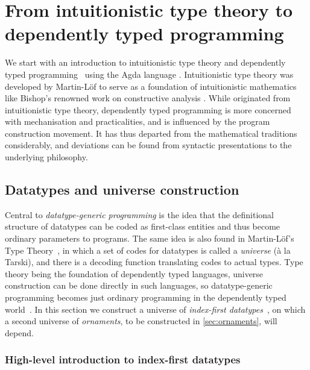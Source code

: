 \chapter{From intuitionistic type theory to dependently typed programming}
\label{chap:background}

We start with an introduction to intuitionistic type theory \citep{ML-ITT} and dependently typed programming~\citep{Altenkirch-why-dependent-types-matter, McBride-Epigram} using the Agda language \citep{Norell-thesis, Norell-Agda, Bove-dependent-types-at-work}.
Intuitionistic type theory was developed by Martin-Löf to serve as a foundation of intuitionistic mathematics like Bishop's renowned work on constructive analysis \citep{Bishop-analysis}.
While originated from intuitionistic type theory, dependently typed programming is more concerned with mechanisation and practicalities, and is influenced by the program construction movement.
It has thus departed from the mathematical traditions considerably, and deviations can be found from syntactic presentations to the underlying philosophy.

\section{Datatypes and universe construction}

Central to \emph{datatype-generic programming} is the idea that the definitional structure of datatypes can be coded as first-class entities and thus become ordinary parameters to programs.
The same idea is also found in Martin-Löf's Type Theory~\citep{ML-ITT}, in which a set of codes for datatypes is called a \emph{universe} (à la Tarski), and there is a decoding function translating codes to actual types.
Type theory being the foundation of dependently typed languages, universe construction can be done directly in such languages, so datatype-generic programming becomes just ordinary programming in the dependently typed world~\citep{Altenkirch-GP-within-DTP}.
In this section we construct a universe of \emph{index-first datatypes}~\citep{Chapman-levitation, Dagand-functional-ornaments}, on which a second universe of \emph{ornaments}, to be constructed in \autoref{sec:ornaments}, will depend.


\subsection{High-level introduction to index-first datatypes}
\label{sec:index-first-datatypes}

